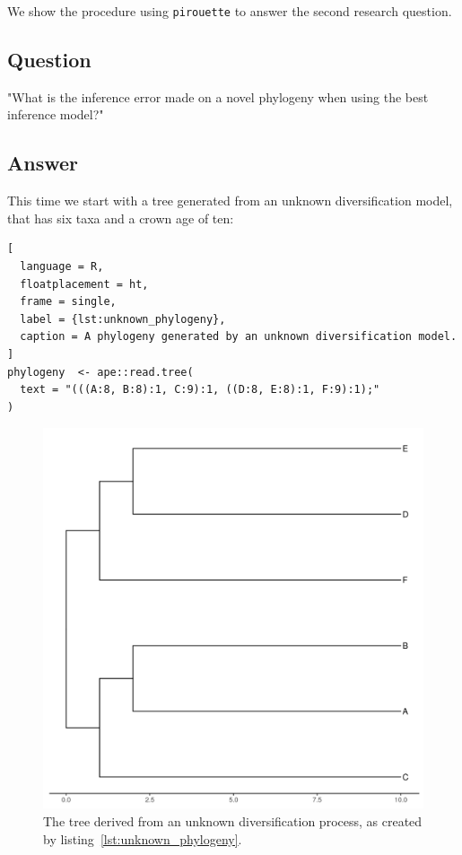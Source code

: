 We show the procedure using \verb;pirouette; to answer the second research 
question.

\subsection{Question}

"What is the inference error made on a novel phylogeny when
using the best inference model?"

\subsection{Answer}

This time we start with a tree generated from an unknown 
diversification model, that has six taxa and a crown age of ten:

\begin{lstlisting}[
  language = R, 
  floatplacement = ht,
  frame = single, 
  label = {lst:unknown_phylogeny},
  caption = A phylogeny generated by an unknown diversification model.
]
phylogeny  <- ape::read.tree(
  text = "(((A:8, B:8):1, C:9):1, ((D:8, E:8):1, F:9):1);"
)
\end{lstlisting}
\begin{figure}[H]
  \includegraphics[width=\textwidth]{example_2/tree_unknown.png}
  \caption{The tree derived from an unknown diversification process, 
    as created by listing~\ref{lst:unknown_phylogeny}.
  }
\end{figure}

